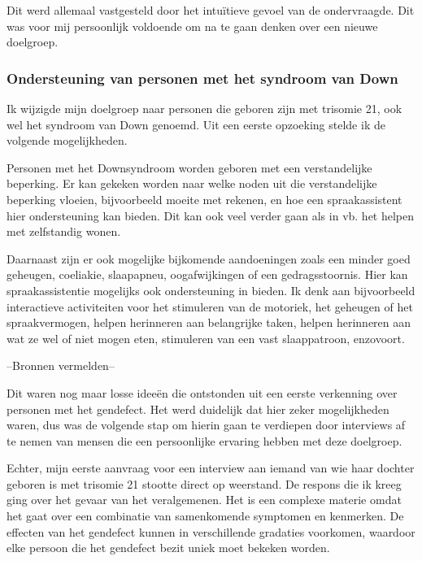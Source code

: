 Dit werd allemaal vastgesteld door het intuïtieve gevoel van de ondervraagde. Dit was voor mij persoonlijk voldoende om na te gaan denken over een nieuwe doelgroep.

\subsubsection{Ondersteuning van personen met het syndroom van Down}
\label{ondersteuning van personen met het syndroom van Down}
Ik wijzigde mijn doelgroep naar personen die geboren zijn met trisomie 21, ook wel het syndroom van Down genoemd. Uit een eerste opzoeking stelde ik de volgende mogelijkheden.

Personen met het Downsyndroom worden geboren met een verstandelijke beperking. Er kan gekeken worden naar welke noden uit die verstandelijke beperking vloeien, bijvoorbeeld moeite met rekenen, en hoe een spraakassistent hier ondersteuning kan bieden. Dit kan ook veel verder gaan als in vb. het helpen met zelfstandig wonen.

Daarnaast zijn er ook mogelijke bijkomende aandoeningen zoals een minder goed geheugen, coeliakie, slaapapneu, oogafwijkingen of een gedragsstoornis. Hier kan spraakassistentie mogelijks ook ondersteuning in bieden. Ik denk aan bijvoorbeeld interactieve activiteiten voor het stimuleren van de motoriek, het geheugen of het spraakvermogen, helpen herinneren aan belangrijke taken, helpen herinneren aan wat ze wel of niet mogen eten, stimuleren van een vast slaappatroon, enzovoort.

--Bronnen vermelden--

Dit waren nog maar losse ideeën die ontstonden uit een eerste verkenning over personen met het gendefect. Het werd duidelijk dat hier zeker mogelijkheden waren, dus was de volgende stap om hierin gaan te verdiepen door interviews af te nemen van mensen die een persoonlijke ervaring hebben met deze doelgroep.

Echter, mijn eerste aanvraag voor een interview aan iemand van wie haar dochter geboren is met trisomie 21 stootte direct op weerstand. De respons die ik kreeg ging over het gevaar van het veralgemenen. Het is een complexe materie omdat het gaat over een combinatie van samenkomende symptomen en kenmerken. De effecten van het gendefect kunnen in verschillende gradaties voorkomen, waardoor elke persoon die het gendefect bezit uniek moet bekeken worden.